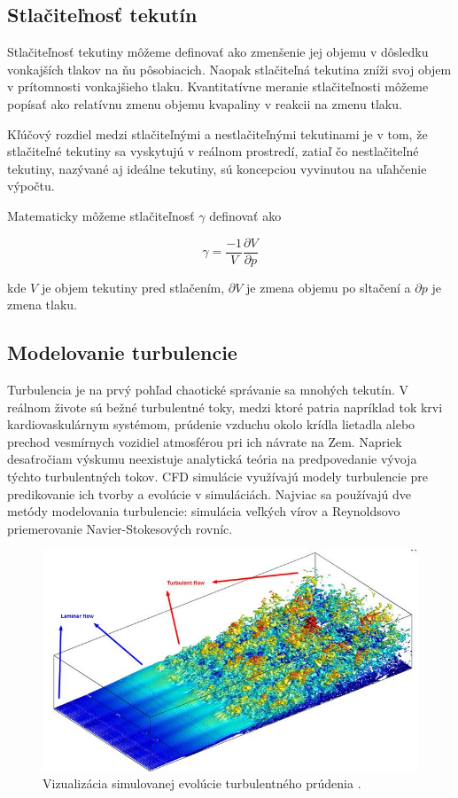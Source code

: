\documentclass[]{tukediphc}
\begin{document}
\subsection{Stlačiteľnosť tekutín}

Stlačiteľnosť tekutiny môžeme definovať ako zmenšenie jej objemu v dôsledku vonkajších tlakov na ňu pôsobiacich. Naopak stlačiteľná tekutina zníži svoj objem v prítomnosti vonkajšieho tlaku. Kvantitatívne meranie stlačiteľnosti môžeme popísať ako relatívnu zmenu objemu kvapaliny v reakcii na zmenu tlaku.

Kľúčový rozdiel medzi stlačiteľnými a nestlačiteľnými tekutinami je v tom, že stlačiteľné tekutiny sa vyskytujú v reálnom prostredí, zatiaľ čo nestlačiteľné tekutiny, nazývané aj ideálne tekutiny, sú koncepciou vyvinutou na uľahčenie výpočtu.

Matematicky môžeme stlačiteľnosť $\gamma$ definovať ako

\begin{equation}
	\gamma = \frac{-1}{V} \frac{\partial V}{\partial p}
\end{equation}

kde $V$ je objem tekutiny pred stlačením, $\partial V$ je zmena objemu po sltačení a $\partial p$ je zmena tlaku.

\subsection{Modelovanie turbulencie}

Turbulencia je na prvý pohľad chaotické správanie sa mnohých tekutín. V reálnom živote sú bežné turbulentné toky, medzi ktoré patria napríklad tok krvi kardiovaskulárnym systémom, prúdenie vzduchu okolo krídla lietadla alebo prechod vesmírnych vozidiel atmosférou pri ich návrate na Zem. Napriek desaťročiam výskumu neexistuje analytická teória na predpovedanie vývoja týchto turbulentných tokov. CFD simulácie využívajú modely turbulencie pre predikovanie ich tvorby a evolúcie v simuláciách. Najviac sa používajú dve metódy modelovania turbulencie: simulácia veľkých vírov a Reynoldsovo priemerovanie Navier-Stokesových rovníc.

\begin{figure}[!ht]
	\centering
	\includegraphics[width=.8\textwidth,angle=0]{figures/turb.jpg}
	\caption{Vizualizácia simulovanej evolúcie turbulentného prúdenia \citep{Vagabond2012}.}
\end{figure}
\end{document}
